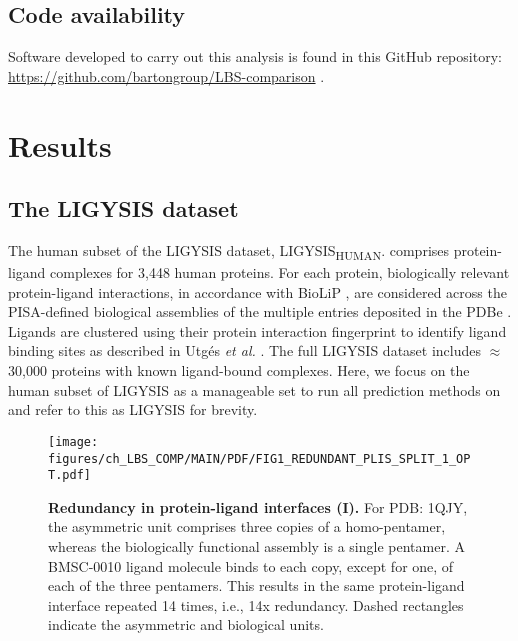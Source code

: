 \subsection{Code availability}

Software developed to carry out this analysis is found in this GitHub repository: \url{https://github.com/bartongroup/LBS-comparison} \cite{UTGES_2024_LBSCOMP_REPO}.

\section{Results}

\subsection{The LIGYSIS dataset}

The human subset of the LIGYSIS dataset, LIGYSIS\textsubscript{HUMAN}. comprises protein-ligand complexes for 3,448 human proteins. For each protein, biologically relevant protein-ligand interactions, in accordance with BioLiP \cite{YANG_2013_BIOLIP}, are considered across the PISA-defined \cite{KRISSINEL_2007_PISA} biological assemblies of the multiple entries deposited in the PDBe \cite{ARMSTRONG_2020_PDBE}. Ligands are clustered using their protein interaction fingerprint to identify ligand binding sites as described in Utgés \textit{et al.} \cite{UTGES_2024_FRAGSYS, UTGES_2024_FRAGSYS_ZENODO}. The full LIGYSIS dataset includes $\approx$30,000 proteins with known ligand-bound complexes. Here, we focus on the human subset of LIGYSIS as a manageable set to run all prediction methods on and refer to this as LIGYSIS for brevity.

\begin{figure}[htb!]
    \centering
    \texttt{[image: figures/ch\_LBS\_COMP/MAIN/PDF/FIG1\_REDUNDANT\_PLIS\_SPLIT\_1\_OPT.pdf]}
    \caption[Redundancy in protein-ligand interfaces (I)]{\textbf{Redundancy in protein-ligand interfaces (I).} For PDB: 1QJY, the asymmetric unit comprises three copies of a homo-pentamer, whereas the biologically functional assembly is a single pentamer. A BMSC-0010 ligand molecule binds to each copy, except for one, of each of the three pentamers. This results in the same protein-ligand interface repeated 14 times, i.e., 14x redundancy. Dashed rectangles indicate the asymmetric and biological units.}
    \label{fig:redundant_plis_1}
\end{figure}


